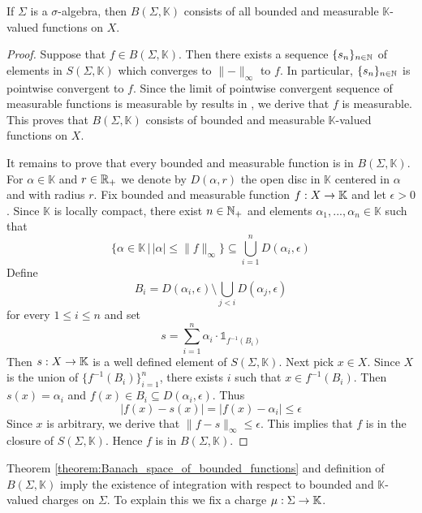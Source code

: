 \begin{theorem}\label{theorem:for_sigma_algebra_each_bounded_measurable_function_is_in_uniform_closure_of_simple_functions}
    If $\Sigma$ is a $\sigma$-algebra, then $B(\Sigma,\mathbb{K})$ consists of all bounded and measurable $\mathbb{K}$-valued functions on $X$.
\end{theorem}
\begin{proof}
    Suppose that $f \in B(\Sigma,\mathbb{K})$. Then there exists a sequence $\{s_n\}_{n\in {\mathbb N}}$ of elements in $S(\Sigma,\mathbb{K})$ which converges to $\lVert - \rVert_{\infty}$ to $f$. In particular, $\{s_n\}_{n\in {\mathbb N}}$ is pointwise convergent to $f$. Since the limit of pointwise convergent sequence of measurable functions is measurable by results in \cite{Integration}, we derive that $f$ is measurable. This proves that $B(\Sigma,\mathbb{K})$ consists of bounded and measurable $\mathbb{K}$-valued functions on $X$.

    It remains to prove that every bounded and measurable function is in $B(\Sigma,\mathbb{K})$. For $\alpha \in \mathbb{K}$ and $r \in {\mathbb R}_+$ we denote by $D(\alpha,r)$ the open disc in $\mathbb{K}$ centered in $\alpha$ and with radius $r$. Fix bounded and measurable function $f:X\rightarrow \mathbb{K}$ and let $\epsilon > 0$. Since $\mathbb{K}$ is locally compact, there exist $n\in {\mathbb N}_+$ and elements $\alpha_1,...,\alpha_n \in \mathbb{K}$ such that
    $$\big\{\alpha \in \mathbb{K}\,\big|\,|\alpha| \leq \lVert f\rVert_{\infty}\big\}\subseteq \bigcup_{i=1}^nD(\alpha_i,\epsilon)$$
    Define
    $$B_i = D(\alpha_i,\epsilon)\setminus \bigcup_{j < i}D(\alpha_j,\epsilon)$$
    for every $1\leq i \leq n$ and set
    $$s = \sum_{i=1}^n\alpha_i\cdot \mathbb{1}_{f^{-1}(B_i)}$$
    Then $s:X\rightarrow \mathbb{K}$ is a well defined element of $S(\Sigma,\mathbb{K})$. Next pick $x \in X$. Since $X$ is the union of $\{f^{-1}(B_i)\}_{i=1}^n$,
    there exists $i$ such that $x \in f^{-1}(B_i)$. Then $s(x) = \alpha_i$ and $f(x) \in B_i\subseteq D(\alpha_i,\epsilon)$. Thus
    $$|f(x) - s(x)| = |f(x) - \alpha_i|\leq \epsilon$$
    Since $x$ is arbitrary, we derive that $\lVert f - s\rVert_{\infty} \leq \epsilon$. This implies that $f$ is in the closure of $S(\Sigma,\mathbb{K})$. Hence $f$ is in $B(\Sigma, \mathbb{K})$.
\end{proof}
\noindent
Theorem \ref{theorem:Banach_space_of_bounded_functions} and definition of $B(\Sigma,\mathbb{K})$ imply the existence of integration with respect to bounded and $\mathbb{K}$-valued charges on $\Sigma$. To explain this we fix a charge $\mu:\Sigma \rightarrow \mathbb{K}$.


